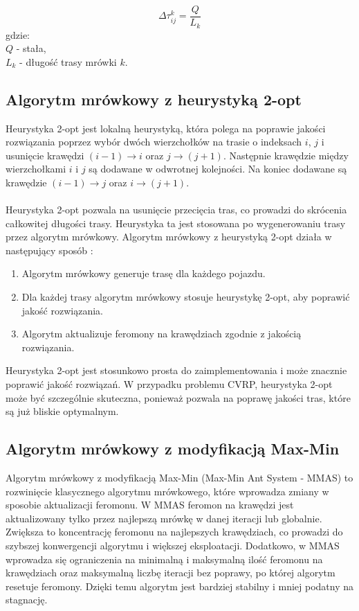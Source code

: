 \documentclass{article}
\begin{document}
\begin{equation}
    \Delta\tau_{ij}^k = \frac{Q}{L_k}
\end{equation}
gdzie:
\\
$Q$ - stała,
\\
$L_k$ - długość trasy mrówki $k$.


\subsection{Algorytm mrówkowy z heurystyką 2-opt}
Heurystyka 2-opt jest lokalną heurystyką, która polega na poprawie jakości rozwiązania poprzez wybór dwóch wierzchołków na trasie o indeksach $i$, $j$ i usunięcie krawędzi $(i-1) \rightarrow  i$ oraz $j \rightarrow (j+1)$. Następnie krawędzie między wierzchołkami $i$ i $j$ są dodawane w odwrotnej kolejności. Na koniec dodawane są krawędzie $(i-1) \rightarrow j$ oraz $i \rightarrow (j+1)$.
\\ \\
Heurystyka 2-opt pozwala na usunięcie przecięcia tras, co prowadzi do skrócenia całkowitej długości trasy. Heurystyka ta jest stosowana po wygenerowaniu trasy przez algorytm mrówkowy. Algorytm mrówkowy z heurystyką 2-opt działa w następujący sposób \cite{tan}:
\begin{enumerate}
    \item Algorytm mrówkowy generuje trasę dla każdego pojazdu.
    \item Dla każdej trasy algorytm mrówkowy stosuje heurystykę 2-opt, aby poprawić jakość rozwiązania.
    \item Algorytm aktualizuje feromony na krawędziach zgodnie z jakością rozwiązania.
\end{enumerate}
Heurystyka 2-opt jest stosunkowo prosta do zaimplementowania i może znacznie poprawić jakość rozwiązań. W przypadku problemu CVRP, heurystyka 2-opt może być szczególnie skuteczna, ponieważ pozwala na poprawę jakości tras, które są już bliskie optymalnym.

\subsection{Algorytm mrówkowy z modyfikacją Max-Min}

Algorytm mrówkowy z modyfikacją Max-Min (Max-Min Ant System - MMAS) \cite{maxmin} to rozwinięcie klasycznego algorytmu mrówkowego, które wprowadza zmiany w sposobie aktualizacji feromonu. W MMAS feromon na krawędzi jest aktualizowany tylko przez najlepszą mrówkę w danej iteracji lub globalnie. Zwiększa to koncentrację feromonu na najlepszych krawędziach, co prowadzi do szybszej konwergencji algorytmu i większej eksploatacji. Dodatkowo, w MMAS wprowadza się ograniczenia na minimalną i maksymalną ilość feromonu na krawędziach oraz maksymalną liczbę iteracji bez poprawy, po której algorytm resetuje feromony. Dzięki temu algorytm jest bardziej stabilny i mniej podatny na stagnację. 
\end{document}
